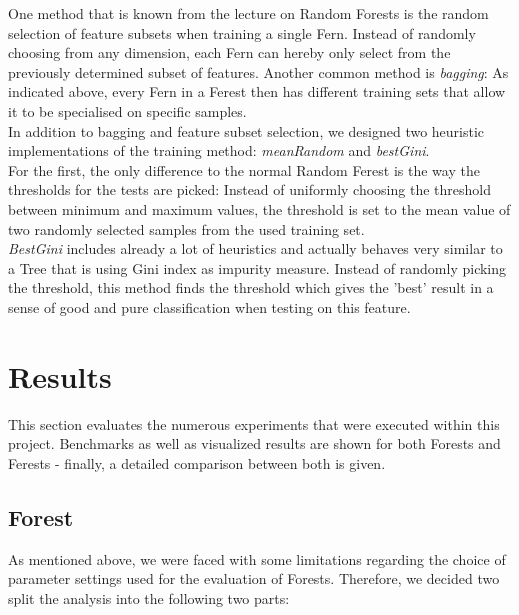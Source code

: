 \documentclass[twocolumn]{article}
\begin{document}
One method that is known from the lecture on Random Forests is the random selection of feature subsets when training a single Fern. Instead of randomly choosing from any dimension, each Fern can hereby only select from the previously determined subset of features. Another common method is \textit{bagging}: As indicated above, every Fern in a Ferest then has different training sets that allow it to be specialised on specific samples.\\
In addition to bagging and feature subset selection, we designed two heuristic implementations of the training method: \textit{meanRandom} and \textit{bestGini}.\\
For the first, the only difference to the normal Random Ferest is the way the thresholds for the tests are picked: Instead of uniformly choosing the threshold between minimum and maximum values, the threshold is set to the mean value of two randomly selected samples from the used training set.\\
\textit{BestGini} includes already a lot of heuristics and actually behaves very similar to a Tree that is using Gini index as impurity measure. Instead of randomly picking the threshold, this method finds the threshold which gives the 'best' result in a sense of good and pure classification when testing on this feature.


\section{Results}

This section evaluates the numerous experiments that were executed within this project. Benchmarks as well as visualized results are shown for both Forests and Ferests - finally, a detailed comparison between both is given.

\subsection{Forest}
As mentioned above, we were faced with some limitations regarding the choice of parameter settings used for the evaluation of Forests. Therefore, we decided two split the analysis into the following two parts:
\end{document}

